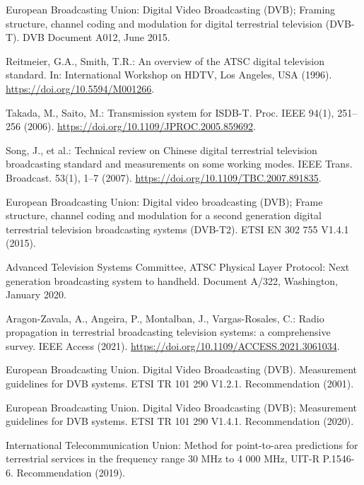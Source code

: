 \documentclass[10pt]{article}
\begin{document}
\begin{thebibliography}{99}

European Broadcasting Union: Digital Video Broadcasting (DVB); Framing structure, channel coding and modulation for digital terrestrial television (DVB-T). DVB Document A012, June 2015.

Reitmeier, G.A., Smith, T.R.: An overview of the ATSC digital television standard. In: International Workshop on HDTV, Los Angeles, USA (1996). \href{https://doi.org/10.5594/M001266}{https://doi.org/10.5594/M001266}.

Takada, M., Saito, M.: Transmission system for ISDB-T. Proc. IEEE 94(1), 251–256 (2006). \href{https://doi.org/10.1109/JPROC.2005.859692}{https://doi.org/10.1109/JPROC.2005.859692}.

Song, J., et al.: Technical review on Chinese digital terrestrial television broadcasting standard and measurements on some working modes. IEEE Trans. Broadcast. 53(1), 1–7 (2007). \href{https://doi.org/10.1109/TBC.2007.891835}{https://doi.org/10.1109/TBC.2007.891835}.

European Broadcasting Union: Digital video broadcasting (DVB); Frame structure, channel coding and modulation for a second generation digital terrestrial television broadcasting systems (DVB-T2). ETSI EN 302 755 V1.4.1 (2015).

Advanced Television Systems Committee, ATSC Physical Layer Protocol: Next generation broadcasting system to handheld. Document A/322, Washington, January 2020.

Aragon-Zavala, A., Angeira, P., Montalban, J., Vargas-Rosales, C.: Radio propagation in terrestrial broadcasting television systems: a comprehensive survey. IEEE Access (2021). \href{https://doi.org/10.1109/ACCESS.2021.3061034}{https://doi.org/10.1109/ACCESS.2021.3061034}.

European Broadcasting Union. Digital Video Broadcasting (DVB). Measurement guidelines for DVB systems. ETSI TR 101 290 V1.2.1. Recommendation (2001).

European Broadcasting Union. Digital Video Broadcasting (DVB); Measurement guidelines for DVB systems. ETSI TR 101 290 V1.4.1. Recommendation (2020).

International Telecommunication Union: Method for point-to-area predictions for terrestrial services in the frequency range 30 MHz to 4 000 MHz, UIT-R P.1546-6. Recommendation (2019).


\end{thebibliography}
\end{document}
